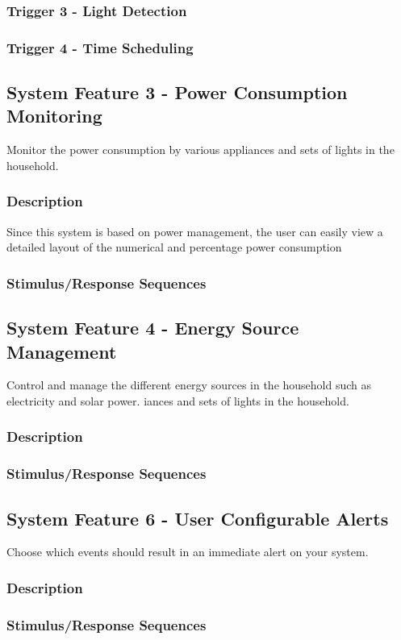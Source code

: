 \documentclass[11pt, a4paper]{article}
\begin{document}
	\subsubsection{Trigger 3 - Light Detection}
	\subsubsection{Trigger 4 - Time Scheduling}
	\subsection{System Feature 3 - Power Consumption Monitoring}
	Monitor the power consumption by various appliances and sets of lights in the household. 
	\subsubsection{Description}
	Since this system is based on power management, the user can easily view a detailed layout of the numerical and percentage power consumption  
	\subsubsection{Stimulus/Response Sequences}
	
	\subsection{System Feature 4 - Energy Source Management}
	Control and manage the different energy sources in the household such as electricity and solar power. iances and sets of lights in the household. 
	\subsubsection{Description}
	\subsubsection{Stimulus/Response Sequences}
	\subsection{System Feature 6 - User Configurable Alerts} 
	Choose which events should result in an immediate alert on your system. 
	\subsubsection{Description}
	\subsubsection{Stimulus/Response Sequences}
	
\end{document}
